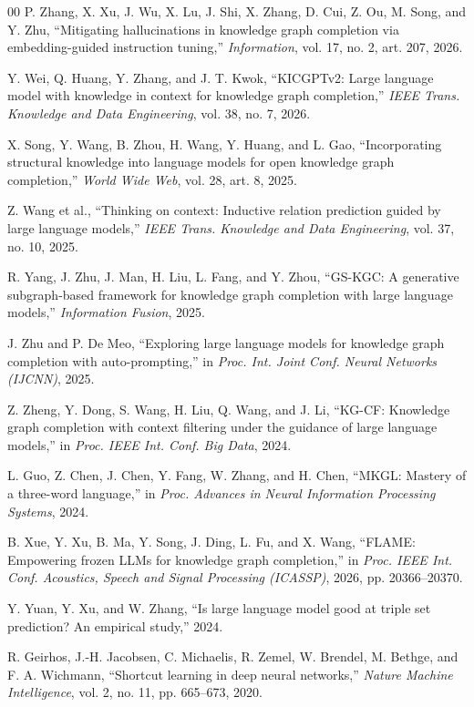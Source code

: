 \documentclass[conference]{IEEEtran}
\begin{document}
\begin{thebibliography}{00}
 P. Zhang, X. Xu, J. Wu, X. Lu, J. Shi, X. Zhang, D. Cui, Z. Ou,
M. Song, and Y. Zhu, ``Mitigating hallucinations in knowledge graph completion
via embedding-guided instruction tuning,'' \emph{Information}, vol. 17, no. 2,
art. 207, 2026.

 Y. Wei, Q. Huang, Y. Zhang, and J. T. Kwok, ``KICGPTv2: Large
language model with knowledge in context for knowledge graph completion,''
\emph{IEEE Trans. Knowledge and Data Engineering}, vol. 38, no. 7, 2026.

 X. Song, Y. Wang, B. Zhou, H. Wang, Y. Huang, and L. Gao,
``Incorporating structural knowledge into language models for open knowledge
graph completion,'' \emph{World Wide Web}, vol. 28, art. 8, 2025.

 Z. Wang et al., ``Thinking on context: Inductive relation
prediction guided by large language models,'' \emph{IEEE Trans. Knowledge and
Data Engineering}, vol. 37, no. 10, 2025.

 R. Yang, J. Zhu, J. Man, H. Liu, L. Fang, and Y. Zhou, ``GS-KGC:
A generative subgraph-based framework for knowledge graph completion with large
language models,'' \emph{Information Fusion}, 2025.

 J. Zhu and P. De Meo, ``Exploring large language models for
knowledge graph completion with auto-prompting,'' in \emph{Proc. Int. Joint
Conf. Neural Networks (IJCNN)}, 2025.

 Z. Zheng, Y. Dong, S. Wang, H. Liu, Q. Wang, and J. Li, ``KG-CF:
Knowledge graph completion with context filtering under the guidance of large
language models,'' in \emph{Proc. IEEE Int. Conf. Big Data}, 2024.

 L. Guo, Z. Chen, J. Chen, Y. Fang, W. Zhang, and H. Chen,
``MKGL: Mastery of a three-word language,'' in \emph{Proc. Advances in Neural
Information Processing Systems}, 2024.

 B. Xue, Y. Xu, B. Ma, Y. Song, J. Ding, L. Fu, and X. Wang,
``FLAME: Empowering frozen LLMs for knowledge graph completion,'' in
\emph{Proc. IEEE Int. Conf. Acoustics, Speech and Signal Processing (ICASSP)},
2026, pp. 20366--20370.

 Y. Yuan, Y. Xu, and W. Zhang, ``Is large language model good at
triple set prediction? An empirical study,'' 2024.

 R. Geirhos, J.-H. Jacobsen, C. Michaelis, R. Zemel,
W. Brendel, M. Bethge, and F. A. Wichmann, ``Shortcut learning in deep neural
networks,'' \emph{Nature Machine Intelligence}, vol. 2, no. 11, pp. 665--673,
2020.


\end{thebibliography}
\end{document}
